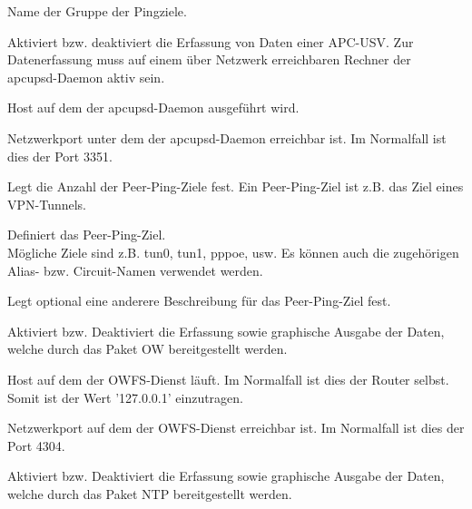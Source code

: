 \begin{description}
   Name der Gruppe der Pingziele. 


  Aktiviert bzw. deaktiviert die Erfassung von Daten einer APC-USV.
  Zur Datenerfassung muss auf einem über Netzwerk erreichbaren Rechner der
  apcupsd-Daemon aktiv sein.


  Host auf dem der apcupsd-Daemon ausgeführt wird.
  

  Netzwerkport unter dem der apcupsd-Daemon erreichbar ist.
  Im Normalfall ist dies der Port 3351.


  Legt die Anzahl der Peer-Ping-Ziele fest. Ein Peer-Ping-Ziel ist z.B. das Ziel 
  eines VPN-Tunnels.
  

  Definiert das Peer-Ping-Ziel. \\
  Mögliche Ziele sind z.B. tun0, tun1, pppoe, usw. Es können auch die zugehörigen 
  Alias- bzw. Circuit-Namen verwendet werden.
  

    Legt optional eine anderere Beschreibung für das Peer-Ping-Ziel fest. 
    

  Aktiviert bzw. Deaktiviert die Erfassung sowie graphische Ausgabe 
  der Daten, welche durch das Paket OW bereitgestellt werden.
  

  Host auf dem der OWFS-Dienst läuft. Im Normalfall ist dies der Router
  selbst. Somit ist der Wert '127.0.0.1' einzutragen.


  Netzwerkport auf dem der OWFS-Dienst erreichbar ist.
  Im Normalfall ist dies der Port 4304.
  

  Aktiviert bzw. Deaktiviert die Erfassung sowie graphische Ausgabe 
  der Daten, welche durch das Paket NTP bereitgestellt werden.
  
\end{description} 

